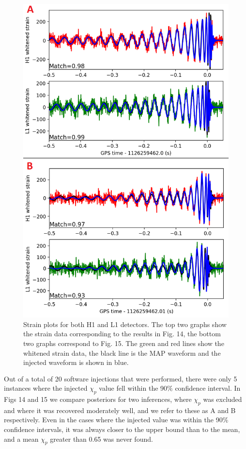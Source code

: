 \documentclass[11pt]{article}
\begin{document}
\begin{figure}[H]
	\includegraphics[scale=0.3]{fig16.png}
	\centering
	\caption{Strain plots for both H1 and L1 detectors. The top two graphs show the strain data corresponding to the results in Fig. 14, the bottom two graphs correspond to Fig. 15. The green and red lines show the whitened strain data, the black line is the MAP waveform and the injected waveform is shown in blue.}
	\centering
\end{figure}

 Out of a total of 20 software injections that were performed, there were only 5 instances where the injected $\chi_p$ value fell within the 90\% confidence interval. In Figs 14 and 15 we compare posteriors for two inferences, where $\chi_p$ was excluded and where it was recovered moderately well, and we refer to these as A and B respectively. Even in the cases where the injected value was within the 90\% confidence intervals, it was always closer to the upper bound than to the mean, and a mean $\chi_p$ greater than 0.65 was never found.
\end{document}
